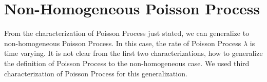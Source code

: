 \documentclass[a4paper,english,10pt]{article}
\begin{document}
%


\section{Non-Homogeneous Poisson Process}
From the characterization of Poisson Process just stated, we can generalize to non-homogeneous Poisson Process. In this case, the rate of Poisson Process $\lambda$ is time varying. It is not clear from the first two characterizations, how to generalize the definition of Poisson Process to the non-homogeneous case. We used third characterization of Poisson Process for this generalization. 
\end{document}
